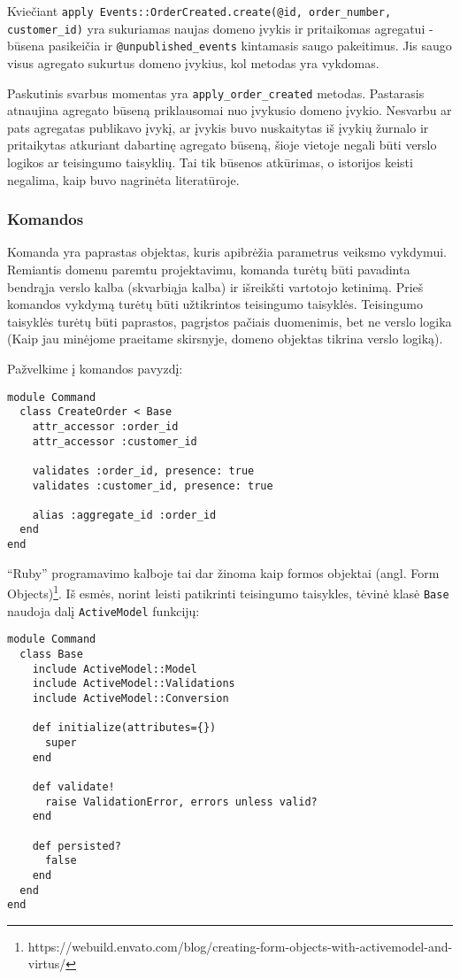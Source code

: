 Kviečiant \lstinline{apply Events::OrderCreated.create(@id, order_number, customer_id)} yra sukuriamas naujas domeno įvykis ir pritaikomas agregatui - būsena pasikeičia ir \lstinline|@unpublished_events| kintamasis saugo pakeitimus. Jis saugo visus agregato sukurtus domeno įvykius, kol metodas yra vykdomas.

Paskutinis svarbus momentas yra \lstinline|apply_order_created| metodas. Pastarasis atnaujina agregato būseną priklausomai nuo įvykusio domeno įvykio. Nesvarbu ar pats agregatas publikavo įvykį, ar įvykis buvo nuskaitytas iš įvykių žurnalo ir pritaikytas atkuriant dabartinę agregato būseną, šioje vietoje negali būti verslo logikos ar teisingumo taisyklių. Tai tik būsenos atkūrimas, o istorijos keisti negalima, kaip buvo nagrinėta literatūroje.

\subsubsection{Komandos}

Komanda yra paprastas objektas, kuris apibrėžia parametrus veiksmo vykdymui. Remiantis domenu paremtu projektavimu, komanda turėtų būti pavadinta bendrąja verslo kalba (skvarbiąja kalba) ir išreikšti vartotojo ketinimą. Prieš komandos vykdymą turėtų būti užtikrintos teisingumo taisyklės. Teisingumo taisyklės turėtų būti paprastos, pagrįstos pačiais duomenimis, bet ne verslo logika (Kaip jau minėjome praeitame skirsnyje, domeno objektas tikrina verslo logiką).

Pažvelkime į komandos pavyzdį:

\begin{lstlisting}
module Command
  class CreateOrder < Base
    attr_accessor :order_id
    attr_accessor :customer_id

    validates :order_id, presence: true
    validates :customer_id, presence: true

    alias :aggregate_id :order_id
  end
end
\end{lstlisting}

``Ruby'' programavimo kalboje tai dar žinoma kaip formos objektai (angl. Form Objects)\footnote{https://webuild.envato.com/blog/creating-form-objects-with-activemodel-and-virtus/}. Iš esmės, norint leisti patikrinti teisingumo taisykles, tėvinė klasė \lstinline|Base| naudoja dalį \lstinline|ActiveModel| funkcijų:

\begin{lstlisting}
module Command
  class Base
    include ActiveModel::Model
    include ActiveModel::Validations
    include ActiveModel::Conversion

    def initialize(attributes={})
      super
    end

    def validate!
      raise ValidationError, errors unless valid?
    end

    def persisted?
      false
    end
  end
end
\end{lstlisting}

